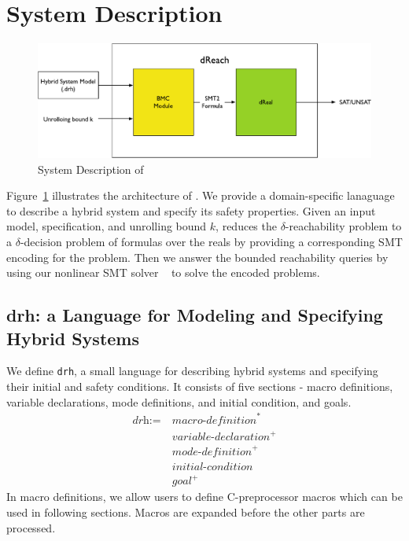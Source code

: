 \section{System Description}

\begin{figure}
  \centering
  \includegraphics[width=\textwidth]{images/dReach}
  \caption{System Description of \dReach{}}
  \label{fig:system-description}
\end{figure}

Figure~\ref{fig:system-description} illustrates the architecture of
\dReach{}. We provide a domain-specific lanaguage to describe a hybrid
system and specify its safety properties. Given an input model,
specification, and unrolling bound $k$, \dReach{} reduces the
$\delta$-reachability problem to a $\delta$-decision problem of
formulas over the reals by providing a corresponding SMT encoding for
the problem. Then we answer the bounded reachability queries by using
our nonlinear SMT solver \dReal{}~\cite{DBLP:conf/cade/GaoKC13} to
solve the encoded problems.

\subsection{drh: a Language for Modeling and Specifying Hybrid Systems}

We define \texttt{drh}, a small language for describing hybrid systems
and specifying their initial and safety conditions. It consists of
five sections - macro definitions, variable declarations, mode
definitions, and initial condition, and goals.
\begin{align*}
  \textit{drh} := \ & \textit{macro-definition}^*\\
                  & \textit{variable-declaration}^+\\
                  & \textit{mode-definition}^+\\
                  & \textit{initial-condition}\\
                  & \textit{goal}^+
\end{align*}
In macro definitions, we allow users to define C-preprocessor macros
which can be used in following sections. Macros are expanded before
the other parts are processed.

